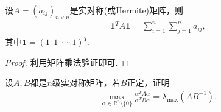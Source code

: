 \documentclass[../../main.tex]{subfiles}%
\begin{document}
\begin{proposition}\label{proposition:对称阵所有元素之和就是一个二次型}
设$A=(a_{ij})_{n\times n}$是实对称(或Hermite)矩阵，则
\begin{align*}
\mathbf{1}^T A \mathbf{1} = \sum_{i=1}^n \sum_{j=1}^n a_{ij},
\end{align*}
其中$\mathbf{1}=(1\ \ 1\ \ \cdots\ \ 1)^T$.
\end{proposition}
\begin{proof}

利用矩阵乘法验证即可.

\end{proof}

\begin{proposition}\label{proposition:两个正定二次型比值的最大值}
设$A,B$都是$n$级实对称矩阵，若$B$正定，证明
\begin{align*}
\max_{\alpha\in\mathbb{R}^n\setminus\{0\}} \frac{\alpha^TA\alpha}{\alpha^TB\alpha} = \lambda_{\max}(AB^{-1}).
\end{align*}
\end{proposition}
\end{document}
